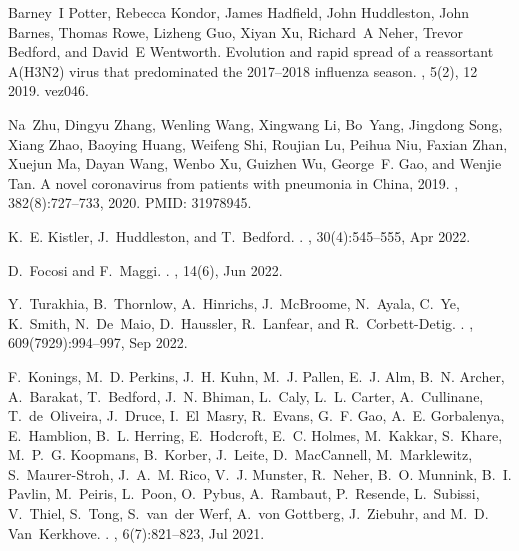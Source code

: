 \documentclass[webpdf,contemporary,large,single]{oup-authoring-template}%
\theoremstyle{thmstyleone}%
\theoremstyle{thmstyletwo}%
\theoremstyle{thmstylethree}%
\begin{document}
\begin{thebibliography}{10}
Barney~I Potter, Rebecca Kondor, James Hadfield, John Huddleston, John Barnes,
  Thomas Rowe, Lizheng Guo, Xiyan Xu, Richard~A Neher, Trevor Bedford, and
  David~E Wentworth.
\newblock Evolution and rapid spread of a reassortant {A(H3N2)} virus that
  predominated the 2017–2018 influenza season.
, 5(2), 12 2019.
\newblock vez046.

Na~Zhu, Dingyu Zhang, Wenling Wang, Xingwang Li, Bo~Yang, Jingdong Song, Xiang
  Zhao, Baoying Huang, Weifeng Shi, Roujian Lu, Peihua Niu, Faxian Zhan, Xuejun
  Ma, Dayan Wang, Wenbo Xu, Guizhen Wu, George~F. Gao, and Wenjie Tan.
\newblock A novel coronavirus from patients with pneumonia in {C}hina, 2019.
, 382(8):727--733, 2020.
\newblock PMID: 31978945.

K.~E. Kistler, J.~Huddleston, and T.~Bedford.
.
, 30(4):545--555, Apr 2022.

D.~Focosi and F.~Maggi.
.
, 14(6), Jun 2022.

Y.~Turakhia, B.~Thornlow, A.~Hinrichs, J.~McBroome, N.~Ayala, C.~Ye, K.~Smith,
  N.~De~Maio, D.~Haussler, R.~Lanfear, and R.~Corbett-Detig.
.
, 609(7929):994--997, Sep 2022.

F.~Konings, M.~D. Perkins, J.~H. Kuhn, M.~J. Pallen, E.~J. Alm, B.~N. Archer,
  A.~Barakat, T.~Bedford, J.~N. Bhiman, L.~Caly, L.~L. Carter, A.~Cullinane,
  T.~de~Oliveira, J.~Druce, I.~El~Masry, R.~Evans, G.~F. Gao, A.~E. Gorbalenya,
  E.~Hamblion, B.~L. Herring, E.~Hodcroft, E.~C. Holmes, M.~Kakkar, S.~Khare,
  M.~P.~G. Koopmans, B.~Korber, J.~Leite, D.~MacCannell, M.~Marklewitz,
  S.~Maurer-Stroh, J.~A.~M. Rico, V.~J. Munster, R.~Neher, B.~O. Munnink, B.~I.
  Pavlin, M.~Peiris, L.~Poon, O.~Pybus, A.~Rambaut, P.~Resende, L.~Subissi,
  V.~Thiel, S.~Tong, S.~van~der Werf, A.~von Gottberg, J.~Ziebuhr, and M.~D.
  Van~Kerkhove.
.
, 6(7):821--823, Jul 2021.


\end{thebibliography}
\end{document}

